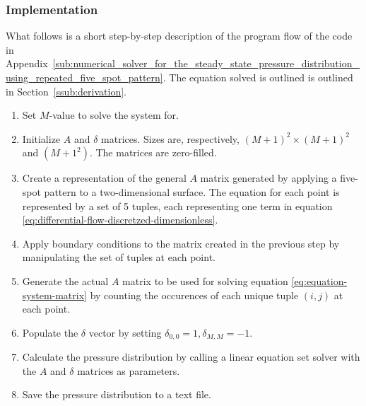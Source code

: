 \subsubsection{Implementation} %
\label{ssub:implementation}
What follows is a short step-by-step description of the program flow of the code in Appendix~\ref{sub:numerical_solver_for_the_steady_state_pressure_distribution_using_repeated_five_spot_pattern}. The equation solved is outlined is outlined in Section~\ref{ssub:derivation}.
\begin{enumerate}
    \item Set $M$-value to solve the system for.
    \item Initialize $A$ and $\delta$ matrices. Sizes are, respectively, $(M+1)^2 \times (M+1)^2$ and $(M+1^2)$. The matrices are zero-filled.
    \item Create a representation of the general $A$ matrix generated by applying a five-spot pattern to a two-dimensional surface. The equation for each point is represented by a set of 5 tuples, each representing one term in equation \eqref{eq:differential-flow-discretzed-dimensionless}.
    \item Apply boundary conditions to the matrix created in the previous step by manipulating the set of tuples at each point.
    \item Generate the actual $A$ matrix to be used for solving equation \eqref{eq:equation-system-matrix} by counting the occurences of each unique tuple $(i,j)$ at each point.
    \item Populate the $\delta$ vector by setting $\delta_{0,0}=1,\delta_{M,M}=-1$.
    \item Calculate the pressure distribution by calling a linear equation set solver with the $A$ and $\delta$ matrices as parameters.
    \item Save the pressure distribution to a text file.
\end{enumerate}


